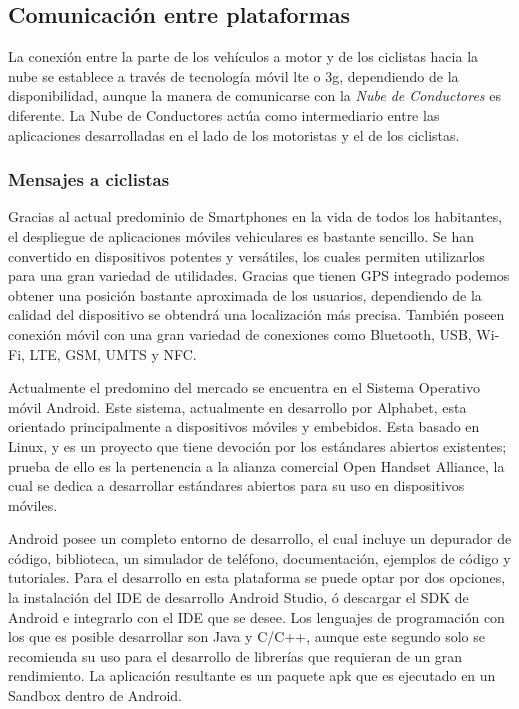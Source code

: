 \subsection{Comunicación entre plataformas}\label{ssection:comunicacion_plataformas}
La conexión entre la parte de los vehículos a motor y de los ciclistas hacia la nube se establece a través de tecnología móvil \gls{lte} o \gls{3g}, dependiendo de la disponibilidad, aunque la manera de comunicarse con la \emph{Nube de Conductores} es diferente. La Nube de Conductores actúa como intermediario entre las aplicaciones desarrolladas en el lado de los motoristas y el de los ciclistas.

\subsubsection{Mensajes a ciclistas}\label{sssection:mensajes_ciclistas}
Gracias al actual predominio de Smartphones en la vida de todos los habitantes, el despliegue de aplicaciones móviles vehiculares es bastante sencillo. Se han convertido en dispositivos potentes y versátiles, los cuales permiten utilizarlos para una gran variedad de utilidades. Gracias que tienen GPS integrado podemos obtener una posición bastante aproximada de los usuarios, dependiendo de la calidad del dispositivo se obtendrá una localización más precisa. También poseen conexión móvil con una gran variedad de conexiones como Bluetooth, USB, Wi-Fi, LTE, GSM, UMTS y NFC.

Actualmente el predomino del mercado se encuentra en el Sistema Operativo móvil Android. Este sistema, actualmente en desarrollo por Alphabet, esta orientado principalmente a dispositivos móviles y embebidos. Esta basado en Linux, y es un proyecto que tiene devoción por los estándares abiertos existentes; prueba de ello es la pertenencia a la alianza comercial Open Handset Alliance, la cual se dedica a desarrollar estándares abiertos para su uso en dispositivos móviles. 

Android posee un completo entorno de desarrollo, el cual incluye un depurador de código, biblioteca, un simulador de teléfono, documentación, ejemplos de código y tutoriales. Para el desarrollo en esta plataforma se puede optar por dos opciones, la instalación del IDE de desarrollo Android Studio, ó descargar el SDK de Android e integrarlo con el IDE que se desee. Los lenguajes de programación con los que es posible desarrollar son Java y C/C++, aunque este segundo solo se recomienda su uso para el desarrollo de librerías que requieran de un gran rendimiento. La aplicación resultante es un paquete apk que es ejecutado en un Sandbox dentro de Android.

